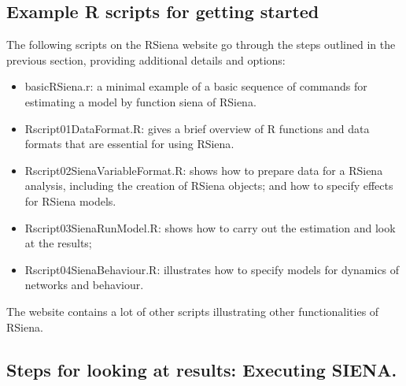 \documentclass[a4paper,fleqn,11pt]{article}
\newcommand{\+}{\, + \,}
\newcommand{\sfn}[1]{\textsf{#1}}
\newcommand{\R}{{\sf R }}
\newcommand{\rs}{{\sf RSiena}}
\newcommand{\RS}{{\sf \textsf{RSiena} }}
\newcommand{\si}{{\sf SIENA}}
\begin{document}
\subsection{Example \R scripts for getting started}
\label{R_scripts}
The following scripts on the \RS website go through the steps
outlined in the previous section, providing additional details and options: \\
\begin{itemize}
    \item \sfn{basicRSiena.r}: a minimal example of a basic sequence of commands
           for estimating a model by function \sfn{siena} of \rs.
	\item \sfn{Rscript01DataFormat.R}: gives a brief overview of \R functions
            and data formats that are essential for using \rs.
	\item \sfn{Rscript02SienaVariableFormat.R}: shows how to prepare data
            for a \RS analysis, including the creation of \RS objects;
            and how to specify effects for \RS models.
	\item \sfn{Rscript03SienaRunModel.R}:
           shows how to carry out the estimation and look at the results;
	\item \sfn{Rscript04SienaBehaviour.R}: illustrates
      how to specify models for dynamics of networks and behaviour.
\end{itemize}
The website contains a lot of other scripts illustrating other functionalities
of \rs.


\subsection{Steps for looking at results: Executing \si .}
\label{S_exec}
\end{document}
